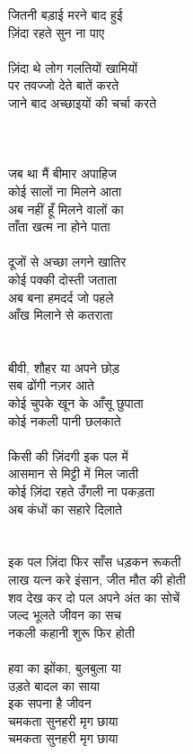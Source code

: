 {{{{{{{{{{{{{{{{{{{{{{{{{{{{{{{{{{{{{{{{{{{{{{{{{{{{{{{{{{{{{{{जितनी बड़ाई मरने बाद हुई\\
ज़िंदा रहते सुन ना पाए\\
\\
ज़िंदा थे लोग गलतियों खामियों\\
पर तवज्जो देते बातें करते\\
जाने बाद अच्छाइयों की चर्चा करते\\
\\
\\
\\
जब था मैं बीमार अपाहिज \\
कोई सालों ना मिलने आता\\
अब नहीं हूँ मिलने वालों का\\
ताँता खत्म ना होने पाता\\
\\
दूजों से अच्छा लगने खातिर\\
कोई पक्की दोस्ती जताता\\
अब बना हमदर्द जो पहले\\
आँख मिलाने से कतराता\\
\\
\\
बीवी, शौहर या अपने छोड़\\
सब ढोंगी नज़र आते\\
कोई चुपके खून के आँसू छुपाता\\
कोई नकली पानी छलकाते\\
\\
किसी की ज़िंदगी इक पल में\\
आसमान से मिट्टी में मिल जाती\\
कोई ज़िंदा रहते उँगली ना पकड़ता\\
अब कंधों का सहारे दिलाते\\
\\
\\
इक पल ज़िंदा फिर साँस धड़कन रूकती\\
लाख यत्न करे इंसान, जीत मौत की होती\\
शव देख कर दो पल अपने अंत का सोचें\\
जल्द भूलते जीवन का सच\\
नकली कहानी शुरू फिर होती\\
\\
हवा का झोंका, बुलबुला या\\
उड़ते बादल का साया\\
इक सपना है जीवन\\
चमकता सुनहरी मृग छाया\\
चमकता सुनहरी मृग छाया\\
\\
}}}}}}}}}}}}}}}}}}}}}}}}}}}}}}}}}}}}}}}}}}}}}}}}}}}}}}}}}}}}}}}
